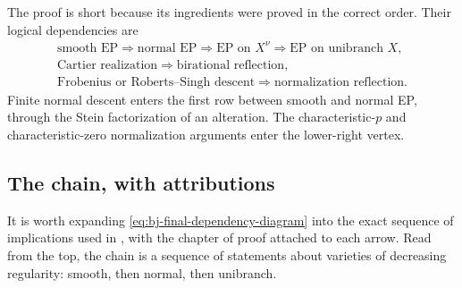 The proof is short because its ingredients were proved in the correct order.
Their logical dependencies are
\[
\begin{gathered}
 \text{smooth EP}\Longrightarrow\text{normal EP}
 \Longrightarrow\text{EP on }X^\nu
 \Longrightarrow\text{EP on unibranch }X,\\
 \text{Cartier realization}\Longrightarrow
 \text{birational reflection},\\
 \text{Frobenius or Roberts--Singh descent}\Longrightarrow
 \text{normalization reflection}.
\end{gathered}
\tag{45.1}\label{eq:bj-final-dependency-diagram}
\]
Finite normal descent enters the first row between smooth and normal EP,
through the Stein factorization of an alteration.
The characteristic-$p$ and characteristic-zero normalization arguments
enter the lower-right vertex.

\subsection{The chain, with attributions}
\label{sec:ch45-attributions}

It is worth expanding \eqref{eq:bj-final-dependency-diagram} into the exact
sequence of implications used in , with the chapter of
proof attached to each arrow.  Read from the top, the chain is a sequence of
statements about varieties of decreasing regularity: smooth, then normal,
then unibranch.

